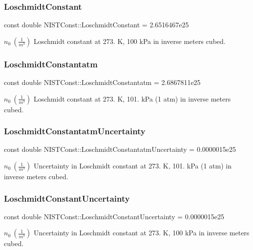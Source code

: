 \subsubsection{\texorpdfstring{Loschmidt\+Constant}{LoschmidtConstant}}
{\footnotesize\ttfamily const double N\+I\+S\+T\+Const\+::\+Loschmidt\+Constant = 2.\+6516467e25}

$n_0 \ (\frac{1}{m^3})$ Loschmidt constant at 273. K, 100 k\+Pa in inverse meters cubed. \mbox{\label{group___loschmidt_constant_ga1442f26c5c9f899f74ef7b546a41c461}} 
\subsubsection{\texorpdfstring{Loschmidt\+Constantatm}{LoschmidtConstantatm}}
{\footnotesize\ttfamily const double N\+I\+S\+T\+Const\+::\+Loschmidt\+Constantatm = 2.\+6867811e25}

$n_0 \ (\frac{1}{m^3})$ Loschmidt constant at 273. K, 101. k\+Pa (1 atm) in inverse meters cubed. \mbox{\label{group___loschmidt_constant_gaed8885c8d2d27d9d8b88c271e0022228}} 
\subsubsection{\texorpdfstring{Loschmidt\+Constantatm\+Uncertainty}{LoschmidtConstantatmUncertainty}}
{\footnotesize\ttfamily const double N\+I\+S\+T\+Const\+::\+Loschmidt\+Constantatm\+Uncertainty = 0.\+0000015e25}

$n_0 \ (\frac{1}{m^3})$ Uncertainty in Loschmidt constant at 273. K, 101. k\+Pa (1 atm) in inverse meters cubed. \mbox{\label{group___loschmidt_constant_gae1bf8845a08d0554f1045083a143c30a}} 
\subsubsection{\texorpdfstring{Loschmidt\+Constant\+Uncertainty}{LoschmidtConstantUncertainty}}
{\footnotesize\ttfamily const double N\+I\+S\+T\+Const\+::\+Loschmidt\+Constant\+Uncertainty = 0.\+0000015e25}

$n_0 \ (\frac{1}{m^3})$ Uncertainty in Loschmidt constant at 273. K, 100 k\+Pa in inverse meters cubed. 